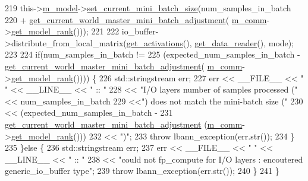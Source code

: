 \begin{DoxyCode}
219       this->\hyperlink{classlbann_1_1Layer_a3d9315e99574166f2f33e37b572021d2}{m\_model}->\hyperlink{classlbann_1_1model_a4f3cc91f8495870723389be15f77184a}{set\_current\_mini\_batch\_size}(num\_samples\_in\_batch
220                                                  + 
      \hyperlink{classlbann_1_1generic__input__layer_a8c3bf45beb91622d56f0dec89cba8e9a}{get\_current\_world\_master\_mini\_batch\_adjustment}(
      \hyperlink{classlbann_1_1Layer_a5de05c52f22e0bbd7c703bec3ad4dbf2}{m\_comm}->\hyperlink{classlbann_1_1lbann__comm_a6422f70c92bed0b78179facc52b066f7}{get\_model\_rank}()));
221 
222       io\_buffer->distribute\_from\_local\_matrix(\hyperlink{classlbann_1_1Layer_a1134b1a4385af199d7272c5aa827fa99}{get\_activations}(), 
      \hyperlink{classlbann_1_1generic__input__layer_aba732becdb02627e3ad4493ac19e8fb6}{get\_data\_reader}(), mode);
223 
224       \textcolor{keywordflow}{if}(num\_samples\_in\_batch !=
225          (expected\_num\_samples\_in\_batch - 
      \hyperlink{classlbann_1_1generic__input__layer_a8c3bf45beb91622d56f0dec89cba8e9a}{get\_current\_world\_master\_mini\_batch\_adjustment}(
      \hyperlink{classlbann_1_1Layer_a5de05c52f22e0bbd7c703bec3ad4dbf2}{m\_comm}->\hyperlink{classlbann_1_1lbann__comm_a6422f70c92bed0b78179facc52b066f7}{get\_model\_rank}()))) \{
226         std::stringstream err;
227         err << \_\_FILE\_\_ << \textcolor{stringliteral}{" "} << \_\_LINE\_\_ << \textcolor{stringliteral}{" :: "}
228             << \textcolor{stringliteral}{"I/O layers number of samples processed ("}<< num\_samples\_in\_batch
229             <<\textcolor{stringliteral}{") does not match the mini-batch size ("}
230             << (expected\_num\_samples\_in\_batch -
231                 \hyperlink{classlbann_1_1generic__input__layer_a8c3bf45beb91622d56f0dec89cba8e9a}{get\_current\_world\_master\_mini\_batch\_adjustment}
      (\hyperlink{classlbann_1_1Layer_a5de05c52f22e0bbd7c703bec3ad4dbf2}{m\_comm}->\hyperlink{classlbann_1_1lbann__comm_a6422f70c92bed0b78179facc52b066f7}{get\_model\_rank}()))
232             << \textcolor{stringliteral}{")"};
233         \textcolor{keywordflow}{throw} lbann\_exception(err.str());
234       \}
235     \}\textcolor{keywordflow}{else} \{
236       std::stringstream err;
237       err << \_\_FILE\_\_ << \textcolor{stringliteral}{" "} << \_\_LINE\_\_ << \textcolor{stringliteral}{" :: "}
238           << \textcolor{stringliteral}{"could not fp\_compute for I/O layers : encoutered generic\_io\_buffer type"};
239       \textcolor{keywordflow}{throw} lbann\_exception(err.str());
240     \}
241   \}
\end{DoxyCode}
